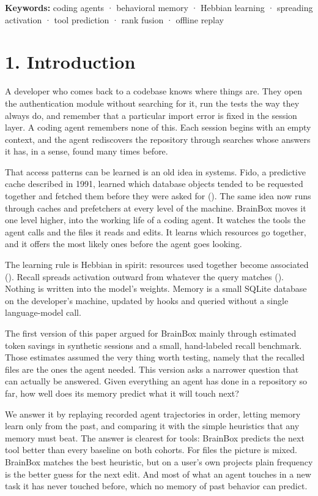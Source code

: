 \documentclass[
  american,
  11pt,
]{article}
\newcounter{none} %
\begin{document}
\textbf{Keywords:} coding agents · behavioral memory · Hebbian learning · spreading activation · tool
prediction · rank fusion · offline replay

\section{1. Introduction}\label{introduction}

A developer who comes back to a codebase knows where things are. They open the authentication module without
searching for it, run the tests the way they always do, and remember that a particular import error is fixed
in the session layer. A coding agent remembers none of this. Each session begins with an empty context, and
the agent rediscovers the repository through searches whose answers it has, in a sense, found many times
before.

That access patterns can be learned is an old idea in systems. Fido, a predictive cache described in 1991,
learned which database objects tended to be requested together and fetched them before they were asked for
(). The same idea now runs through caches and prefetchers at
every level of the machine. BrainBox moves it one level higher, into the working life of a coding agent. It
watches the tools the agent calls and the files it reads and edits. It learns which resources go together, and
it offers the most likely ones before the agent goes looking.

The learning rule is Hebbian in spirit: resources used together become associated
(). Recall spreads activation outward from whatever the query matches
(). Nothing is written into the model's weights. Memory is
a small SQLite database on the developer's machine, updated by hooks and queried without a single
language-model call.

The first version of this paper argued for BrainBox mainly through estimated token savings in synthetic
sessions and a small, hand-labeled recall benchmark. Those estimates assumed the very thing worth testing,
namely that the recalled files are the ones the agent needed. This version asks a narrower question that can
actually be answered. Given everything an agent has done in a repository so far, how well does its memory
predict what it will touch next?

We answer it by replaying recorded agent trajectories in order, letting memory learn only from the past, and
comparing it with the simple heuristics that any memory must beat. The answer is clearest for tools: BrainBox
predicts the next tool better than every baseline on both cohorts. For files the picture is mixed. BrainBox
matches the best heuristic, but on a user's own projects plain frequency is the better guess for the next
edit. And most of what an agent touches in a new task it has never touched before, which no memory of past
behavior can predict.
\end{document}
